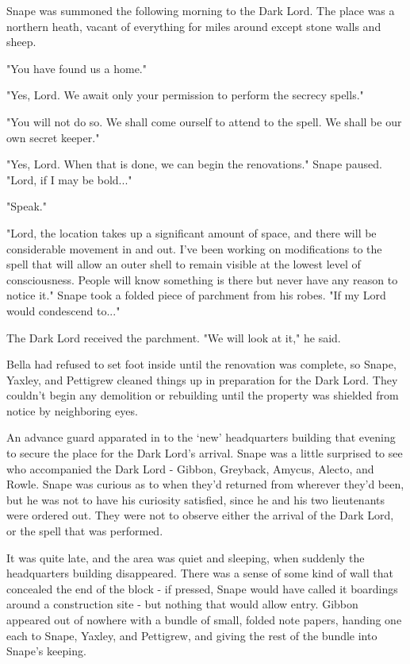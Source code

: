 \documentclass[a4paper,11pt]{article}
\begin{document}
Snape was summoned the following morning to the Dark Lord. The place was a northern heath, vacant of everything for miles around except stone walls and sheep.

"You have found us a home."

"Yes, Lord. We await only your permission to perform the secrecy spells."

"You will not do so. We shall come ourself to attend to the spell. We shall be our own secret keeper."

"Yes, Lord. When that is done, we can begin the renovations." Snape paused. "Lord, if I may be bold..."

"Speak."

"Lord, the location takes up a significant amount of space, and there will be considerable movement in and out. I've been working on modifications to the spell that will allow an outer shell to remain visible at the lowest level of consciousness. People will know something is there but never have any reason to notice it." Snape took a folded piece of parchment from his robes. "If my Lord would condescend to..."

The Dark Lord received the parchment. "We will look at it," he said.

Bella had refused to set foot inside until the renovation was complete, so Snape, Yaxley, and Pettigrew cleaned things up in preparation for the Dark Lord. They couldn't begin any demolition or rebuilding until the property was shielded from notice by neighboring eyes.

An advance guard apparated in to the `new' headquarters building that evening to secure the place for the Dark Lord's arrival. Snape was a little surprised to see who accompanied the Dark Lord - Gibbon, Greyback, Amycus, Alecto, and Rowle. Snape was curious as to when they'd returned from wherever they'd been, but he was not to have his curiosity satisfied, since he and his two lieutenants were ordered out. They were not to observe either the arrival of the Dark Lord, or the spell that was performed.

It was quite late, and the area was quiet and sleeping, when suddenly the headquarters building disappeared. There was a sense of some kind of wall that concealed the end of the block - if pressed, Snape would have called it boardings around a construction site - but nothing that would allow entry. Gibbon appeared out of nowhere with a bundle of small, folded note papers, handing one each to Snape, Yaxley, and Pettigrew, and giving the rest of the bundle into Snape's keeping.
\end{document}
